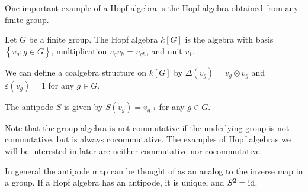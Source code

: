 \begin{example}
    \label{groupalgebra}
    One important example of a Hopf algebra is the Hopf algebra obtained from
    any finite group. 

    Let $G$ be a finite group. The Hopf algebra $k[G]$ is the algebra with
    basis $\left\{ v_g: g \in G \right\}$, multiplication $v_g v_h = v_{gh}$,
    and unit $v_1$. 

    We can define a coalgebra structure on $k[G]$ by $\Delta(v_g) = v_g \otimes v_g$
    and $\varepsilon(v_g) = 1$ for any $g \in G$.

    The antipode $S$ is given by $S(v_g) = v_{g^{-1}}$ for any $g \in G$.

    Note that the group algebra is not commutative if the underlying group is
    not commutative, but is always cocommutative. The examples of Hopf
    algebras we will be interested in later are neither commutative nor
    cocommutative. 
\end{example}

In general the antipode map can be thought of as an analog to the inverse map
in a group. If a Hopf algebra has an antipode, it is unique, and $S^2 = \operatorname{id}$.

